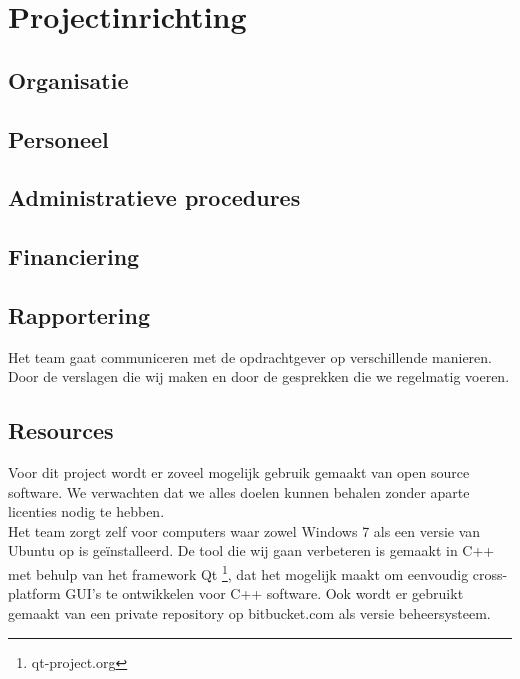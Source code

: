 \section{Projectinrichting}
\subsection{Organisatie}
\subsection{Personeel}
\subsection{Administratieve procedures}
\subsection{Financiering}
\subsection{Rapportering}
Het team gaat communiceren met de opdrachtgever op verschillende manieren. Door de verslagen die wij maken en door de gesprekken die we regelmatig voeren.

\subsection{Resources}
Voor dit project wordt er zoveel mogelijk gebruik gemaakt van open source software. We verwachten dat we alles doelen kunnen behalen zonder aparte licenties nodig te hebben. \\

Het team zorgt zelf voor computers waar zowel Windows 7 als een versie van Ubuntu op is ge\"installeerd. De tool die wij gaan verbeteren is gemaakt in C++ met behulp van het framework Qt \footnote{qt-project.org}, dat het mogelijk maakt om eenvoudig cross-platform GUI's te ontwikkelen voor C++ software. Ook wordt er gebruikt gemaakt van een private repository op bitbucket.com als versie beheersysteem. 
